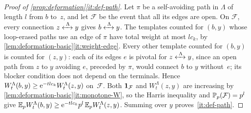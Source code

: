 \begin{proof}[Proof of \cref{prop:deformation}\ref{it:def-path}]
Let $\pi$ be a self-avoiding path in $\Lambda$ of length $l$ from $b$ to~$z$, and let $\mathcal F$ be the
event that all its edges are open. On $\mathcal F$, every connection $z\xleftrightarrow{\;\Lambda\;}y$ gives
$b\xleftrightarrow{\;\Lambda\;}y$. The templates counted for $(b,y)$ whose loop-erased paths use an edge of $\pi$
have total weight at most $lc_k$, by \cref{lem:deformation-basic}\ref{it:weight-edge}. Every other
template counted for $(b,y)$ is counted for $(z,y)$: each of its edges $e$ is pivotal for
$z\xleftrightarrow{\;\Lambda\;}y$, since an open path from $z$ to $y$ avoiding $e$, preceded by $\pi$, would connect
$b$ to $y$ without~$e$; its blocker condition does not depend on the terminals. Hence
$W^\Lambda_t(b,y)\ge\mathrm{e}^{-tlc_k}W^\Lambda_t(z,y)$ on~$\mathcal F$. Both $\mathbf{1}_{\mathcal F}$ and
$W^\Lambda_t(z,y)$ are increasing by \cref{lem:deformation-basic}\ref{it:monotone-W}, so the Harris
inequality and $\mathbb P_p(\mathcal F)=p^l$ give
$\mathbb E_pW^\Lambda_t(b,y)\ge\mathrm{e}^{-tlc_k}p^l\,\mathbb E_pW^\Lambda_t(z,y)$. Summing over $y$ proves~\ref{it:def-path}.
\end{proof}
